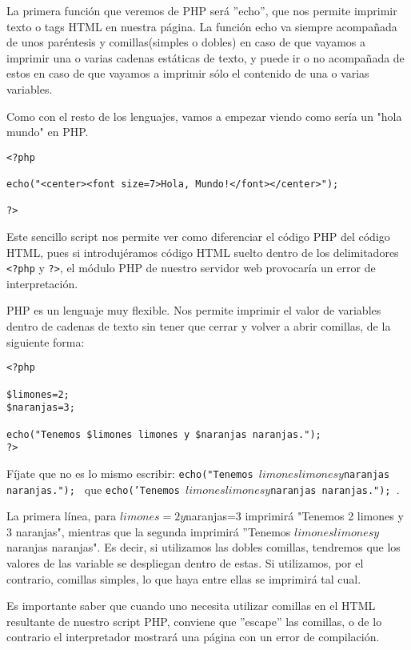 La primera función  que veremos de PHP será ''echo'',  que nos permite
imprimir  texto o  tags HTML  en nuestra  página. La  función echo  va
siempre acompañada de unos paréntesis  y comillas(simples o dobles) en
caso  de que  vayamos a  imprimir una  o varias  cadenas estáticas  de
texto, y puede  ir o no acompañada  de estos en caso de  que vayamos a
imprimir sólo el contenido de una o varias variables.


Como con el resto de los  lenguajes, vamos a empezar viendo como sería
un "hola mundo" en PHP.

\begin{verbatim}
<?php

echo("<center><font size=7>Hola, Mundo!</font></center>");

?>
\end{verbatim}

Este sencillo  script nos permite  ver como diferenciar el  código PHP
del código HTML,  pues si introdujéramos código HTML  suelto dentro de
los delimitadores \verb+<?php+  y \verb+?>+, el módulo  PHP de nuestro
servidor web provocaría un error de interpretación.

PHP es  un lenguaje  muy flexible.  Nos permite  imprimir el  valor de
variables dentro de  cadenas de texto sin tener que  cerrar y volver a
abrir comillas, de la siguiente forma:

\begin{verbatim}
<?php

$limones=2;
$naranjas=3;

echo("Tenemos $limones limones y $naranjas naranjas.");
?>

\end{verbatim}

Fíjate  que  no es  lo  mismo  escribir: {\tt  echo("Tenemos  $limones
limones  y $naranjas  naranjas."); }  que {\tt  echo('Tenemos $limones
limones y $naranjas naranjas."); }.

La primera línea,  para $limones=2 y $naranjas=3  imprimirá "Tenemos 2
limones y  3 naranjas",  mientras que  la segunda  imprimirá ''Tenemos
$limones limones  y $naranjas naranjas".  Es decir, si  utilizamos las
dobles  comillas,  tendremos  que  los  valores  de  las  variable  se
despliegan dentro de estas. Si  utilizamos, por el contrario, comillas
simples, lo que haya entre ellas se imprimirá tal cual.

Es importante  saber que cuando  uno necesita utilizar comillas  en el
HTML resultante  de nuestro  script PHP,  conviene que  ''escape'' las
comillas, o de  lo contrario el interpretador mostrará  una página con
un error de compilación.

